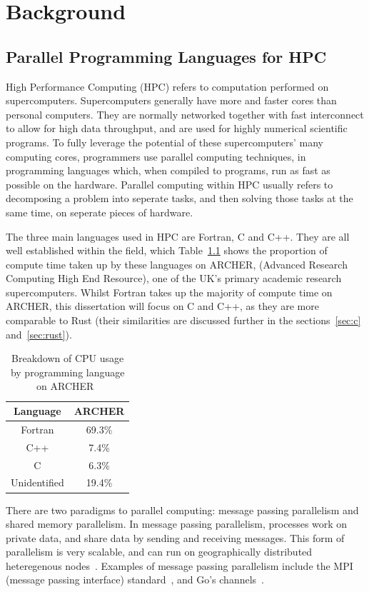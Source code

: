 \chapter{Background}
\section{Parallel Programming Languages for HPC}
High Performance Computing (HPC) refers to computation performed on supercomputers. 
Supercomputers generally have more and faster cores than personal computers. They are normally networked together with fast interconnect to allow for high data throughput, and are used for highly numerical scientific programs.
To fully leverage the potential of these supercomputers' many computing cores, programmers use parallel computing techniques, in programming languages which, when compiled to programs, run as fast as possible on the hardware. Parallel computing within HPC usually refers to decomposing a problem into seperate tasks, and then solving those tasks at the same time, on seperate pieces of hardware.

The three main languages used in HPC are Fortran, C and C++. They are all well established within the field, which Table~\ref{tab:langs} shows the proportion of compute time taken up by these languages on ARCHER, (Advanced Research Computing High End Resource), one of the UK's primary academic research supercomputers.
Whilst Fortran takes up the majority of compute time on ARCHER, this dissertation will focus on C and C++, as they are more comparable to Rust (their similarities are discussed further in the sections~\ref{sec:c} and~\ref{sec:rust}).

\begin{table}[h]
  \centering
  \begin{tabular}{|c|c|}
    \hline
    Language & \textbf{ARCHER} \\
    \hline
    Fortran & 69.3\% \\
    \hline
    C++ & 7.4\% \\
    \hline
    C & 6.3\% \\
    \hline
    Unidentified & 19.4\% \\
    \hline
  \end{tabular}
  \caption{Breakdown of CPU usage by programming language on ARCHER~\cite{Turner2015}}
  \label{tab:langs}
\end{table}

There are two paradigms to parallel computing: message passing parallelism and shared memory parallelism. In message passing parallelism, processes work on private data, and share data by sending and receiving messages. This form of parallelism is very scalable, and can run on geographically distributed heteregenous nodes~\cite{SETI}. Examples of message passing parallelism include the MPI (message passing interface) standard~\cite{TheMPIForum}, and Go's channels~\cite{GoChan}.

